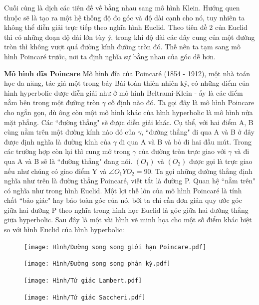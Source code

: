 \begin{multicols}{2}
	
	Cuối cùng là dịch các tiên đề về bằng nhau sang mô hình Klein. Hướng quen thuộc sẽ là tạo ra một hệ thống độ đo góc và độ dài cạnh cho nó, tuy nhiên ta không thể diễn giải trực tiếp theo nghĩa hình Euclid. Theo tiên đề 2 của Euclid thì có những đoạn độ dài lớn tùy ý, trong khi độ dài các dây cung của một đường tròn thì không vượt quá đường kính đường tròn đó.
	Thế nên ta tạm sang mô hình Poincaré trước, nơi ta định nghĩa sự bằng nhau của góc dễ hơn.
	
	\textbf{\color{lichsutoanhoc}Mô hình đĩa Poincare}
	Mô hình đĩa của Poincaré (1854 - 1912), một nhà toán học đa năng, tác giả một trong bảy Bài toán thiên nhiên kỷ, có những điểm của hình hyperbolic được diễn giải như ở mô hình Beltrami-Klein - ấy là các điểm nằm bên trong một đường tròn $\gamma $ cố định nào đó. Ta gọi đây là mô hình Poincare cho ngắn gọn, dù ông còn một mô hình khác của hình hyperbolic là mô hình nửa mặt phẳng. 
	Các ``đường thẳng" sẽ được diễn giải khác. Cụ thể, với hai điểm A, B cùng nằm trên một đường kính nào đó của $\gamma$, ``đường thẳng" đi qua A và B ở đây được định nghĩa là đường kính của $\gamma$ đi qua A và B và bỏ đi hai đầu mút. Trong các trường hợp còn lại thì cung mở trong $\gamma$ của đường tròn trực giao với $\gamma$ và đi qua A và B sẽ là ``đường thẳng" đang nói. $(O_1)$ và $(O_2)$ được gọi là trực giao nếu như chúng có giao điểm Y và $ \angle O_1YO_2 = 90$. Ta gọi những đường thẳng định nghĩa như trên là đường thẳng Poincaré, viết tắt là đường P. 
	Quan hệ ``nằm trên" có nghĩa như trong hình Euclid. Một lợi thế lớn của mô hình Poincaré là tính chất ``bảo giác" hay bảo toàn góc của nó, bởi ta chỉ cần đơn giản quy ước góc giữa hai đường P theo nghĩa trong hình học Euclid là góc giữa hai đường thẳng giữa hyperbolic.
	Sau đây là một vài hình vẽ minh họa cho một số điểm khác biệt so với hình Euclid của hình hyperbolic:
	
	\begin{figure}[ht]
		\texttt{[image: Hình/Đường song song giới hạn Poincare.pdf]}
	\end{figure}
	
	\begin{figure}[ht]
		\texttt{[image: Hình/Đường song song phân kỳ.pdf]}
	\end{figure}
	
	\begin{figure}[ht]
		\texttt{[image: Hình/Tứ giác Lambert.pdf]}
	\end{figure}
	
	\begin{figure}[ht]
		\texttt{[image: Hình/Tứ giác Saccheri.pdf]}
	\end{figure}
	

\end{multicols}
